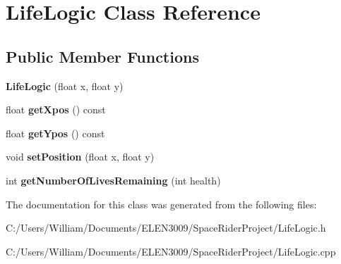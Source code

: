 \hypertarget{class_life_logic}{}\section{Life\+Logic Class Reference}
\label{class_life_logic}
\subsection*{Public Member Functions}
\begin{DoxyCompactItemize}
\item 
\mbox{\label{class_life_logic_a535c38f9912f4298ebd1b86425a5cd59}} 
{\bfseries Life\+Logic} (float x, float y)
\item 
\mbox{\label{class_life_logic_a84143479d62e550adebd0c319ae3520a}} 
float {\bfseries get\+Xpos} () const
\item 
\mbox{\label{class_life_logic_a7b7591ddd38994fc052a022177690d72}} 
float {\bfseries get\+Ypos} () const
\item 
\mbox{\label{class_life_logic_a6080cbd8a0c6f6767504974999061209}} 
void {\bfseries set\+Position} (float x, float y)
\item 
\mbox{\label{class_life_logic_aedae9924b6ebe33182c3b8b8150b8060}} 
int {\bfseries get\+Number\+Of\+Lives\+Remaining} (int health)
\end{DoxyCompactItemize}


The documentation for this class was generated from the following files\+:\begin{DoxyCompactItemize}
\item 
C\+:/\+Users/\+William/\+Documents/\+E\+L\+E\+N3009/\+Space\+Rider\+Project/Life\+Logic.\+h\item 
C\+:/\+Users/\+William/\+Documents/\+E\+L\+E\+N3009/\+Space\+Rider\+Project/Life\+Logic.\+cpp\end{DoxyCompactItemize}
